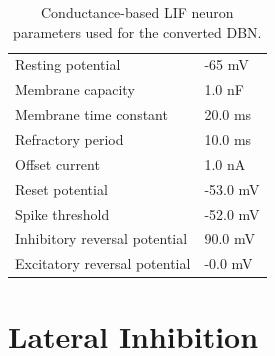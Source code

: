 \begin{table}[h!]
\caption{Conductance-based LIF neuron parameters used for the converted DBN.}
\centering
\label{cobalifparam}
\begin{tabularx}{0.65\textwidth}{|XX|}
\hline
Resting potential    			& -65 mV 		    \\
Membrane capacity    			& 1.0 nF 		     \\
Membrane time constant    		& 20.0 ms		             \\
Refractory period     			& 10.0 ms		                 \\
Offset current    				& 1.0 nA		              \\
Reset potential     			& -53.0 mV 	               \\
Spike threshold     			& -52.0 mV          \\
Inhibitory reversal potential  & 90.0 mV	              \\
Excitatory reversal potential  & -0.0 mV 	               \\\hline
\end{tabularx}
\end{table}
   
\pagebreak   
   
\section{Lateral Inhibition}   
   
